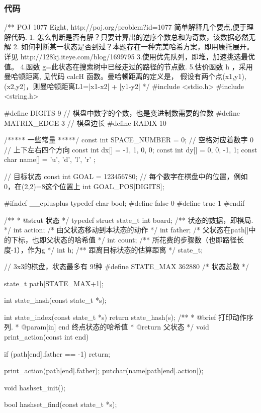 \subsubsection{代码}
\begin{Codex}[label=eight_digits_astar.c]
/** POJ 1077 Eight, http://poj.org/problem?id=1077
 简单解释几个要点,便于理解代码.
1. 怎么判断是否有解？只要计算出的逆序个数总和为奇数，该数据必然无解
2. 如何判断某一状态是否到过？本题存在一种完美哈希方案，即用康托展开。
        详见 http://128kj.iteye.com/blog/1699795
3.使用优先队列，即堆，加速挑选最优值。
4.函数 g=此状态在搜索树中已经走过的路径的节点数.
5.估价函数 h ，采用曼哈顿距离, 见代码 calcH 函数。曼哈顿距离的定义是，
 假设有两个点(x1,y1),(x2,y2)，则曼哈顿距离L1=|x1-x2| + |y1-y2|
 */
#include <stdio.h>
#include <string.h>

#define DIGITS 9 // 棋盘中数字的个数，也是变进制数需要的位数
#define     MATRIX_EDGE 3       // 棋盘边长
#define RADIX 10

/***** 一些常量 *****/
const int SPACE_NUMBER = 0; // 空格对应着数字 0
// 上下左右四个方向
const int dx[] = {-1, 1, 0, 0};
const int dy[] = {0, 0, -1, 1};
const char name[] = { 'u', 'd', 'l', 'r' };

// 目标状态
const int GOAL = 123456780;
// 每个数字在棋盘中的位置，例如0，在(2,2)=8这个位置上
int GOAL_POS[DIGITS];

#ifndef __cplusplus
typedef char bool;
#define false 0
#define true 1
#endif

/**
 * @strut 状态
 */
typedef struct state_t {
    int board;  /** 状态的数据，即棋局. */
    int action; /* 由父状态移动到本状态的动作 */
    int father; /* 父状态在path[]中的下标，也即父状态的哈希值 */
    int count;  /** 所花费的步骤数（也即路径长度-1），作为g */
    int h; /** 距离目标状态的估算距离 */
} state_t;

// 3x3的棋盘，状态最多有 9!种
#define STATE_MAX 362880  /* 状态总数 */

state_t path[STATE_MAX+1];

int state_hash(const state_t *s);

int state_index(const state_t *s) {
    return state_hash(s);
}
/**
 * @brief 打印动作序列.
 * @param[in] end 终点状态的哈希值
 * @return 父状态
 */
void print_action(const int end) {
    if (path[end].father == -1) return;

    print_action(path[end].father);
    putchar(name[path[end].action]);
}

void hashset_init();

bool hashset_find(const state_t *s);


\end{Codex}
